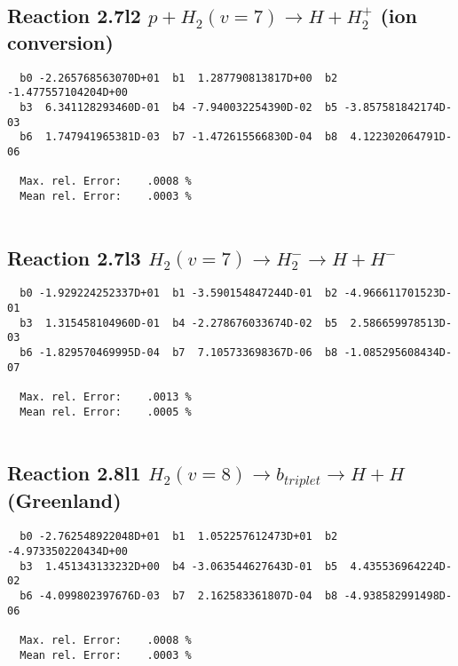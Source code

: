 \documentclass[12pt]{article}
\begin{document}
\subsection{
Reaction 2.7l2
$ p + H_2(v=7) \rightarrow H + H_2^+$ (ion conversion)
}


\begin{small}\begin{verbatim}
  b0 -2.265768563070D+01  b1  1.287790813817D+00  b2 -1.477557104204D+00
  b3  6.341128293460D-01  b4 -7.940032254390D-02  b5 -3.857581842174D-03
  b6  1.747941965381D-03  b7 -1.472615566830D-04  b8  4.122302064791D-06

  Max. rel. Error:    .0008 %
  Mean rel. Error:    .0003 %


\end{verbatim}\end{small}


\subsection{
Reaction 2.7l3
 $ H_2(v=7) \rightarrow H_2^- \rightarrow H + H^-$
}


\begin{small}\begin{verbatim}
  b0 -1.929224252337D+01  b1 -3.590154847244D-01  b2 -4.966611701523D-01
  b3  1.315458104960D-01  b4 -2.278676033674D-02  b5  2.586659978513D-03
  b6 -1.829570469995D-04  b7  7.105733698367D-06  b8 -1.085295608434D-07

  Max. rel. Error:    .0013 %
  Mean rel. Error:    .0005 %


\end{verbatim}\end{small}


\newpage
\subsection{
Reaction 2.8l1
$ H_2(v=8) \rightarrow b_{triplet}\rightarrow H + H $ (Greenland) 
}


\begin{small}\begin{verbatim}
  b0 -2.762548922048D+01  b1  1.052257612473D+01  b2 -4.973350220434D+00
  b3  1.451343133232D+00  b4 -3.063544627643D-01  b5  4.435536964224D-02
  b6 -4.099802397676D-03  b7  2.162583361807D-04  b8 -4.938582991498D-06

  Max. rel. Error:    .0008 %
  Mean rel. Error:    .0003 %


\end{verbatim}\end{small}
\end{document}
